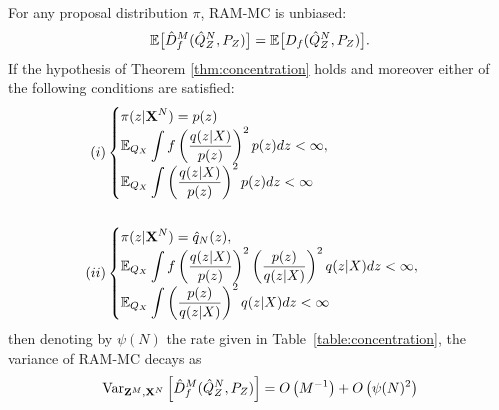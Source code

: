 \begin{theorem}\label{thm:mc-variance}
For any proposal distribution $\pi$, RAM-MC is unbiased:
%
\begin{align*}
\mathbb{E}\bigl[\hat{D}^M_f( \hat{Q}_Z^N , P_Z)\bigr] =\mathbb{E}\bigl[D_f( \hat{Q}^N_{Z} , P_Z )\bigr].
\end{align*}
%
If the hypothesis of Theorem \ref{thm:concentration} holds and moreover either of the following conditions are satisfied:
\begin{align*}
(i)& \begin{cases}
\displaystyle \pi(z|\mathbf{X}^N) = p(z) \\
\displaystyle \mathbb{E}_{Q_X} \int f\left( \frac{q(z|X)}{p(z)}\right)^2 p(z) dz  < \infty, \\
\displaystyle \mathbb{E}_{Q_X} \int \left( \frac{q(z|X)}{p(z)} \right)^2 p(z) dz < \infty
\end{cases}\\ \ \\
(ii)& \begin{cases}
\displaystyle \pi(z | \mathbf{X}^N) = \hat{q}_N(z), \\
\displaystyle \mathbb{E}_{Q_X} \int f\left( \frac{q(z|X)}{p(z)}\right)^2 \left(\frac{p(z)}{q(z|X)}\right)^2 q(z|X) dz < \infty, \\
\displaystyle \mathbb{E}_{Q_X} \int \left(\frac{p(z)}{q(z|X)} \right)^2 q(z|X) dz < \infty
\end{cases}
\end{align*}
then denoting by $\psi(N)$ the rate given in Table~\ref{table:concentration}, the variance of RAM-MC decays as
\begin{align*}
    \text{Var}_{\mathbf{Z}^M, \mathbf{X}^N} \left[\hat{D}^M_f( \hat{Q}_Z^N , P_Z)  \right] = 
    O\left(M^{-1}\right) + O\left( \psi(N)^2 \right) 
\end{align*}
%
\end{theorem}

